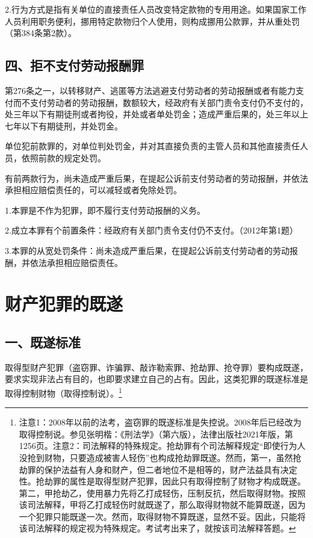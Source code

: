 2.行为方式是指有关单位的直接责任人员改变特定款物的专用用途。如果国家工作人员利用职务便利，挪用特定款物归个人使用，则构成挪用公款罪，并从重处罚（第384条第2款）。

\subsection*{四、拒不支付劳动报酬罪}

第276条之一，以转移财产、逃匿等方法逃避支付劳动者的劳动报酬或者有能力支付而不支付劳动者的劳动报酬，数额较大，经政府有关部门责令支付仍不支付的，处三年以下有期徒刑或者拘役，并处或者单处罚金；造成严重后果的，处三年以上七年以下有期徒刑，并处罚金。

单位犯前款罪的，对单位判处罚金，并对其直接负责的主管人员和其他直接责任人员，依照前款的规定处罚。

有前两款行为，尚未造成严重后果，在提起公诉前支付劳动者的劳动报酬，并依法承担相应赔偿责任的，可以减轻或者免除处罚。

1.本罪是不作为犯罪，即不履行支付劳动报酬的义务。

2.成立本罪有个前置条件：经政府有关部门责令支付仍不支付。（2012年第1题）

3.本罪的从宽处罚条件：尚未造成严重后果，在提起公诉前支付劳动者的劳动报酬，并依法承担相应赔偿责任。

\section{财产犯罪的既遂}

\subsection*{一、既遂标准}

取得型财产犯罪（盗窃罪、诈骗罪、敲诈勒索罪、抢劫罪、抢夺罪）要构成既遂，要求实现非法占有目的，也即要求建立自己的占有。因此，这类犯罪的既遂标准是取得控制财物（取得控制说）。\footnote{注意1：2008年以前的法考，盗窃罪的既遂标准是失控说。2008年后已经改为取得控制说。参见张明楷：《刑法学》（第六版），法律出版社2021年版，第1256页。注意2：司法解释的特殊规定。抢劫罪有个司法解释规定“即使行为人没抢到财物，只要造成被害人轻伤”也构成抢劫罪既遂。然而，第一，虽然抢劫罪的保护法益有人身和财产，但二者地位不是相等的，财产法益具有决定性。抢劫罪的属性是取得型财产犯罪，因此只有取得控制了财物才构成既遂。第二，甲抢劫乙，使用暴力先将乙打成轻伤，压制反抗，然后取得财物。按照该司法解释，甲将乙打成轻伤时就既遂了，那么取得财物就不能算既遂，因为一个犯罪只能既遂一次。然而，取得财物不算既遂，显然不妥。因此，只能将该司法解释的规定视为特殊规定。考试考出来了，就按该司法解释答题。}

